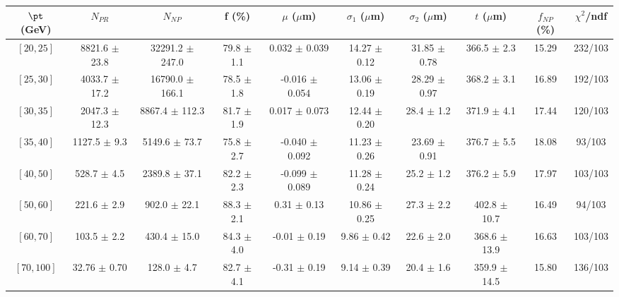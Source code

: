 \begin{tabular}{c||c|c|c|c|c|c|c||c|c}
$\pt$ (GeV) & $N_{PR}$ & $N_{NP}$ & f (\%) & $\mu$ ($\mu$m) & $\sigma_1$ ($\mu$m) & $\sigma_2$ ($\mu$m)  & $t$ ($\mu$m) & $f_{NP}$ (\%) & $\chi^2$/ndf \\
\hline
$[20, 25]$ & 8821.6 $\pm$ 23.8 & 32291.2 $\pm$ 247.0 & 79.8 $\pm$ 1.1 & 0.032 $\pm$ 0.039 & 14.27 $\pm$ 0.12 & 31.85 $\pm$ 0.78 & 366.5 $\pm$ 2.3 & 15.29 & 232/103\\
$[25, 30]$ & 4033.7 $\pm$ 17.2 & 16790.0 $\pm$ 166.1 & 78.5 $\pm$ 1.8 & -0.016 $\pm$ 0.054 & 13.06 $\pm$ 0.19 & 28.29 $\pm$ 0.97 & 368.2 $\pm$ 3.1 & 16.89 & 192/103\\
$[30, 35]$ & 2047.3 $\pm$ 12.3 & 8867.4 $\pm$ 112.3 & 81.7 $\pm$ 1.9 & 0.017 $\pm$ 0.073 & 12.44 $\pm$ 0.20 & 28.4 $\pm$ 1.2 & 371.9 $\pm$ 4.1 & 17.44 & 120/103\\
$[35, 40]$ & 1127.5 $\pm$ 9.3 & 5149.6 $\pm$ 73.7 & 75.8 $\pm$ 2.7 & -0.040 $\pm$ 0.092 & 11.23 $\pm$ 0.26 & 23.69 $\pm$ 0.91 & 376.7 $\pm$ 5.5 & 18.08 & 93/103\\
$[40, 50]$ & 528.7 $\pm$ 4.5 & 2389.8 $\pm$ 37.1 & 82.2 $\pm$ 2.3 & -0.099 $\pm$ 0.089 & 11.28 $\pm$ 0.24 & 25.2 $\pm$ 1.2 & 376.2 $\pm$ 5.9 & 17.97 & 103/103\\
$[50, 60]$ & 221.6 $\pm$ 2.9 & 902.0 $\pm$ 22.1 & 88.3 $\pm$ 2.1 & 0.31 $\pm$ 0.13 & 10.86 $\pm$ 0.25 & 27.3 $\pm$ 2.2 & 402.8 $\pm$ 10.7 & 16.49 & 94/103\\
$[60, 70]$ & 103.5 $\pm$ 2.2 & 430.4 $\pm$ 15.0 & 84.3 $\pm$ 4.0 & -0.01 $\pm$ 0.19 & 9.86 $\pm$ 0.42 & 22.6 $\pm$ 2.0 & 368.6 $\pm$ 13.9 & 16.63 & 103/103\\
$[70, 100]$ & 32.76 $\pm$ 0.70 & 128.0 $\pm$ 4.7 & 82.7 $\pm$ 4.1 & -0.31 $\pm$ 0.19 & 9.14 $\pm$ 0.39 & 20.4 $\pm$ 1.6 & 359.9 $\pm$ 14.5 & 15.80 & 136/103\\
\end{tabular}
